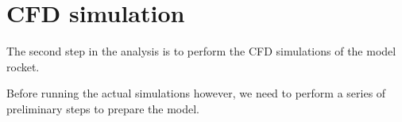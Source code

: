 \section{CFD simulation}
\label{sec:cfd_simulation}

The second step in the analysis is to perform the CFD simulations of the model rocket.

Before running the actual simulations however, we need to perform a series of preliminary steps to prepare the model.










